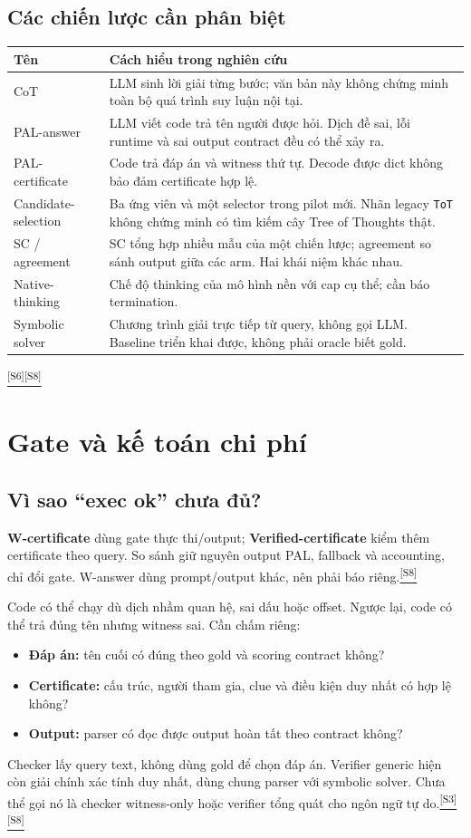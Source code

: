 \documentclass[11pt,a4paper]{article}
\newcommand{\src}[1]{\hyperlink{src-#1}{\textcolor{muted}{\textsuperscript{[S#1]}}}}
\begin{document}
\subsection{Các chiến lược cần phân biệt}
\begin{tabularx}{\textwidth}{@{}p{34mm}Y@{}}
\toprule
\textbf{Tên} & \textbf{Cách hiểu trong nghiên cứu}\\
\midrule
CoT & LLM sinh lời giải từng bước; văn bản này không chứng minh toàn bộ quá trình suy luận nội tại.\\
PAL-answer & LLM viết code trả tên người được hỏi. Dịch đề sai, lỗi runtime và sai output contract đều có thể xảy ra.\\
PAL-certificate & Code trả đáp án và witness thứ tự. Decode được dict không bảo đảm certificate hợp lệ.\\
Candidate-selection & Ba ứng viên và một selector trong pilot mới. Nhãn legacy \texttt{ToT} không chứng minh có tìm kiếm cây Tree of Thoughts thật.\\
SC / agreement & SC tổng hợp nhiều mẫu của một chiến lược; agreement so sánh output giữa các arm. Hai khái niệm khác nhau.\\
Native-thinking & Chế độ thinking của mô hình nền với cap cụ thể; cần báo termination.\\
Symbolic solver & Chương trình giải trực tiếp từ query, không gọi LLM. Baseline triển khai được, không phải oracle biết gold.\\
\bottomrule
\end{tabularx}
\src{6}\src{8}

\section{Gate và kế toán chi phí}
\subsection{Vì sao “exec ok” chưa đủ?}
\textbf{W-certificate} dùng gate thực thi/output; \textbf{Verified-certificate} kiểm thêm certificate theo query. So sánh giữ nguyên output PAL, fallback và accounting, chỉ đổi gate. W-answer dùng prompt/output khác, nên phải báo riêng.\src{8}

Code có thể chạy dù dịch nhầm quan hệ, sai dấu hoặc offset. Ngược lại, code có thể trả đúng tên nhưng witness sai. Cần chấm riêng:
\begin{itemize}
  \item \textbf{Đáp án:} tên cuối có đúng theo gold và scoring contract không?
  \item \textbf{Certificate:} cấu trúc, người tham gia, clue và điều kiện duy nhất có hợp lệ không?
  \item \textbf{Output:} parser có đọc được output hoàn tất theo contract không?
\end{itemize}
Checker lấy query text, không dùng gold để chọn đáp án. Verifier generic hiện còn giải chính xác tính duy nhất, dùng chung parser với symbolic solver. Chưa thể gọi nó là checker witness-only hoặc verifier tổng quát cho ngôn ngữ tự do.\src{3}\src{8}
\end{document}
